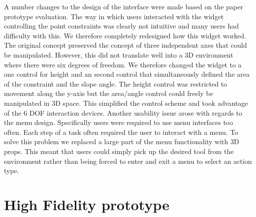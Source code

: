 \documentclass{sig-alternate-05-2015}
\begin{document}
A number changes to the design of the interface were made based on the paper prototype evaluation.
\newline\newline
The way in which users interacted with the widget controlling the point constraints was clearly not intuitive and many users had difficulty with this. We therefore completely redesigned how this widget worked. The original concept preserved the concept of three independent axes that could be manipulated. However, this did not translate well into a 3D environment where there were six degrees of freedom. We therefore changed the widget to a one control for height and an second control that simultaneously defined the area of the constraint and the slope angle. The height control was restricted to movement along the y-axis but the area/angle control could freely be manipulated in 3D space. This simplified the control scheme and took advantage of the 6 DOF interaction devices.
\newline\newline
Another usability issue arose with regards to the menu design. Specifically users were required to use menu interfaces too often. Each step of a task often required the user to interact with a menu. To solve this problem we replaced a large part of the menu functionality with 3D props. This meant that users could simply pick up the desired tool from the environment rather than being forced to enter and exit a menu to select an action type.

\section{High Fidelity prototype}
\end{document}
